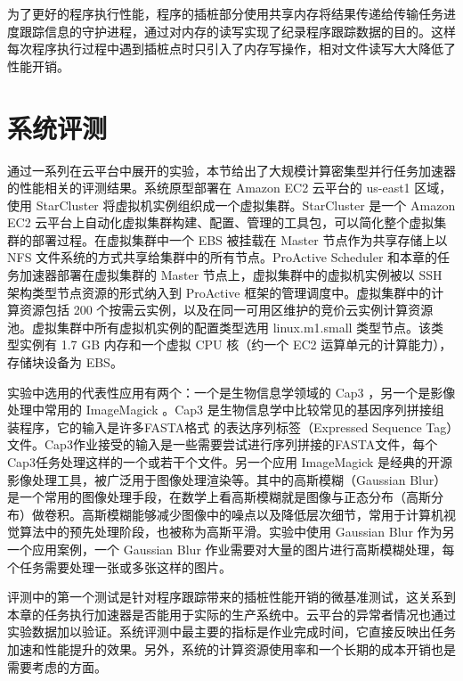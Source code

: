 为了更好的程序执行性能，程序的插桩部分使用共享内存将结果传递给传输任务进度跟踪信息的守护进程，通过对内存的读写实现了纪录程序跟踪数据的目的。这样每次程序执行过程中遇到插桩点时只引入了内存写操作，相对文件读写大大降低了性能开销。

\section{系统评测}
\label{sec:no2_eval}
通过一系列在云平台中展开的实验，本节给出了大规模计算密集型并行任务加速器的性能相关的评测结果。系统原型部署在 Amazon EC2 云平台的 us-east1 区域，使用 StarCluster \cite{starcluster} 将虚拟机实例组织成一个虚拟集群。StarCluster \cite{starcluster} 是一个 Amazon EC2 云平台上自动化虚拟集群构建、配置、管理的工具包，可以简化整个虚拟集群的部署过程。在虚拟集群中一个 EBS 被挂载在 Master 节点作为共享存储上以 NFS 文件系统的方式共享给集群中的所有节点。ProActive Scheduler 和本章的任务加速器部署在虚拟集群的 Master 节点上，虚拟集群中的虚拟机实例被以 SSH 架构类型节点资源的形式纳入到 ProActive 框架的管理调度中。虚拟集群中的计算资源包括 200 个按需云实例，以及在同一可用区维护的竞价云实例计算资源池。虚拟集群中所有虚拟机实例的配置类型选用 linux.m1.small 类型节点。该类型实例有 1.7 GB 内存和一个虚拟 CPU 核（约一个 EC2 运算单元的计算能力），存储块设备为 EBS。

实验中选用的代表性应用有两个：一个是生物信息学领域的 Cap3 \cite{Huang:1999:Cap3}，另一个是影像处理中常用的 ImageMagick \cite{imagemagick}。Cap3 是生物信息学中比较常见的基因序列拼接组装程序，它的输入是许多FASTA格式 \cite{fasta} 的表达序列标签（Expressed Sequence Tag）文件。Cap3作业接受的输入是一些需要尝试进行序列拼接的FASTA文件，每个Cap3任务处理这样的一个或若干个文件。另一个应用 ImageMagick 是经典的开源影像处理工具，被广泛用于图像处理渲染等。其中的高斯模糊（Gaussian Blur）是一个常用的图像处理手段，在数学上看高斯模糊就是图像与正态分布（高斯分布）做卷积。高斯模糊能够减少图像中的噪点以及降低层次细节，常用于计算机视觉算法中的预先处理阶段，也被称为高斯平滑。实验中使用 Gaussian Blur 作为另一个应用案例，一个 Gaussian Blur 作业需要对大量的图片进行高斯模糊处理，每个任务需要处理一张或多张这样的图片。

评测中的第一个测试是针对程序跟踪带来的插桩性能开销的微基准测试，这关系到本章的任务执行加速器是否能用于实际的生产系统中。云平台的异常者情况也通过实验数据加以验证。系统评测中最主要的指标是作业完成时间，它直接反映出任务加速和性能提升的效果。另外，系统的计算资源使用率和一个长期的成本开销也是需要考虑的方面。

